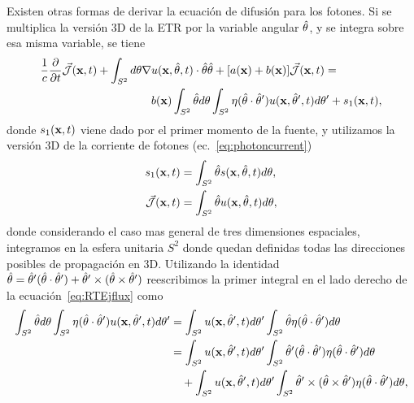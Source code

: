 Existen otras formas de derivar la ecuación de difusión para los fotones. 
Si se multiplica la versión 3D de la ETR  por la variable angular $\hat{\theta}$, y se integra 
sobre esa misma variable, se tiene
\begin{equation}
\begin{split}
\begin{aligned}
\frac{1}{c}\frac{\partial}{\partial t} \vec{ \mathcal{J}}(\mathbf{x},t)+\int_{S^2} d\theta \nabla & u(\mathbf{x},\hat{\theta},t) \cdot \hat{\theta} \hat{\theta} 
+[a(\mathbf{x})+b(\mathbf{x})]\vec{ \mathcal{J}}(\mathbf{x},t)=\\
&b(\mathbf{x})\int_{S^2} \hat{\theta} d\theta \int_{S^2} \eta(\hat{\theta} \cdot \hat{\theta}')  u(\mathbf{x},\hat{\theta}',t) d\theta' + s_1(\mathbf{x},t),
\end{aligned}
\end{split}
\label{eq:RTEjflux}
\end{equation}
donde $s_1(\mathbf{x},t)$ viene dado por el primer momento de la fuente, y utilizamos 
la versión 3D de la corriente de fotones (ec.~\eqref{eq:photoncurrent})
\begin{equation}
\begin{split}
\begin{aligned}
s_1(\mathbf{x},t)&=\int_{S^2} \hat{\theta} s(\mathbf{x},\hat{\theta},t) d\theta,\\
 \vec{ \mathcal{J}}(\mathbf{x},t)&=\int_{S^2} \hat{\theta} u(\mathbf{x},\hat{\theta},t) d\theta,
\label{eq:RTEsflux1}
\end{aligned}
\end{split}
\end{equation}
donde considerando el caso mas general de tres dimensiones espaciales, integramos en la esfera unitaria $S^2$ donde quedan definidas todas las direcciones posibles de propagación en 3D. 
Utilizando la identidad $\hat{\theta}= \hat{\theta}'(\hat{\theta}\cdot \hat{\theta}') + \hat{\theta}' \times(\hat{\theta} \times \hat{\theta}')$ reescribimos la primer integral en el lado derecho de la ecuación~\eqref{eq:RTEjflux} como
\begin{equation}
\begin{split}
\begin{aligned}
\int_{S^2} \hat{\theta} d\theta \int_{S^2} \eta(\hat{\theta} \cdot \hat{\theta}')  u(\mathbf{x},\hat{\theta}',t) d\theta' 
&=\int_{S^2} u(\mathbf{x},\hat{\theta}',t) d\theta'  \int_{S^2} \hat{\theta} \eta(\hat{\theta} \cdot \hat{\theta}') d\theta\\
&=\int_{S^2} u(\mathbf{x},\hat{\theta}',t) d\theta' \int_{S^2} \hat{\theta}' (\hat{\theta} \cdot \hat{\theta}') \eta(\hat{\theta} \cdot \hat{\theta}') d\theta \\&\quad+ \int_{S^2} u(\mathbf{x},\hat{\theta}',t) d\theta' \int_{S^2}  \hat{\theta}' \times(\hat{\theta} \times \hat{\theta}') \eta(\hat{\theta} \cdot \hat{\theta}') d\theta ,
\end{aligned}
\end{split}
\label{eq:RTEjint}
\end{equation}
